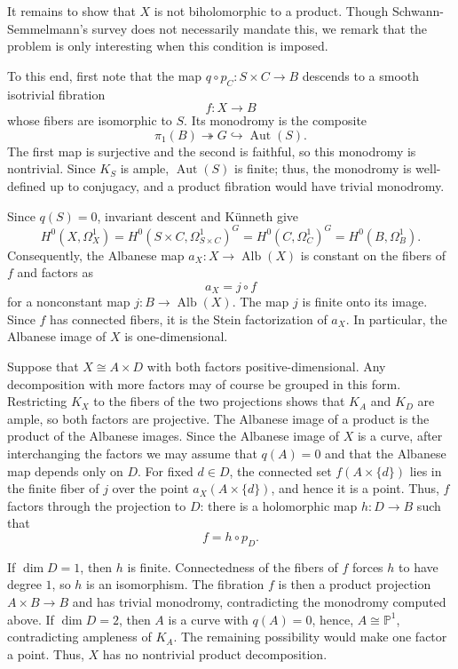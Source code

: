 \documentclass[11pt]{amsart}
\numberwithin{equation}{section}
\theoremstyle{plain}
\theoremstyle{definition}
\newcommand{\PP}{\mathbb{P}}
\DeclareMathOperator{\Aut}{Aut}
\DeclareMathOperator{\Alb}{Alb}
\begin{document}
It remains to show that $X$ is not biholomorphic to a product. Though Schwann-Semmelmann's survey does not necessarily mandate this, we remark that the problem is only interesting when this condition is imposed.

To this end, first note that the map $q\circ p_C\colon S\times C\to B$ descends to a smooth isotrivial fibration
$$f\colon X\longrightarrow B$$
whose fibers are isomorphic to $S$. Its monodromy is the composite
$$\pi_1(B)\twoheadrightarrow G\hookrightarrow\Aut(S).$$
The first map is surjective and the second is faithful, so this monodromy is nontrivial. Since $K_S$ is ample, $\Aut(S)$ is finite; thus, the monodromy is well-defined up to conjugacy, and a product fibration would have trivial monodromy.

Since $q(S)=0$, invariant descent and K\"unneth give
$$H^0(X,\Omega_X^1)
=H^0(S\times C,\Omega^1_{S\times C})^G
=H^0(C,\Omega_C^1)^G
=H^0(B,\Omega_B^1).$$
Consequently, the Albanese map $a_X\colon X\to\Alb(X)$ is constant on the fibers of $f$ and factors as
$$a_X=j\circ f$$
for a nonconstant map $j\colon B\to\Alb(X)$. The map $j$ is finite onto its image. Since $f$ has connected fibers, it is the Stein factorization of $a_X$. In particular, the Albanese image of $X$ is one-dimensional.

Suppose that $X\cong A\times D$ with both factors positive-dimensional. Any decomposition with more factors may of course be grouped in this form. Restricting $K_X$ to the fibers of the two projections shows that $K_A$ and $K_D$ are ample, so both factors are projective. The Albanese image of a product is the product of the Albanese images. Since the Albanese image of $X$ is a curve, after interchanging the factors we may assume that $q(A)=0$ and that the Albanese map depends only on $D$. For fixed $d\in D$, the connected set $f(A\times\{d\})$ lies in the finite fiber of $j$ over the point $a_X(A\times\{d\})$, and hence it is a point. Thus, $f$ factors through the projection to $D$: there is a holomorphic map $h\colon D\to B$ such that
$$f=h\circ p_D.$$

If $\dim D=1$, then $h$ is finite. Connectedness of the fibers of $f$ forces $h$ to have degree $1$, so $h$ is an isomorphism. The fibration $f$ is then a product projection $A\times B\to B$ and has trivial monodromy, contradicting the monodromy computed above. If $\dim D=2$, then $A$ is a curve with $q(A)=0$, hence, $A\cong\PP^1$, contradicting ampleness of $K_A$. The remaining possibility would make one factor a point. Thus, $X$ has no nontrivial product decomposition.
\end{document}
